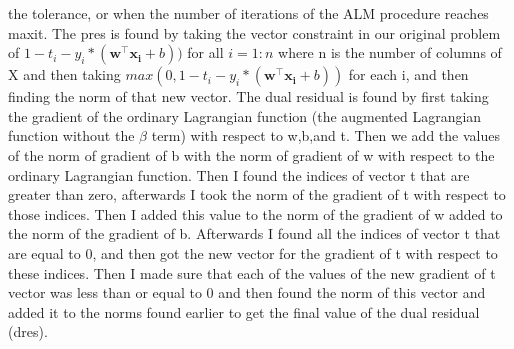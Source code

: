 \documentclass[11pt]{article}
\begin{document}
the 
tolerance, or when the number of iterations of the ALM procedure reaches maxit. The pres is found by 
taking 
the vector constraint in our original problem of $1-t_{i}-y_{i}*\left(\mathbf{w}^\intercal 
\mathbf{x_{i}}
+b 
\right))$ for all $i= 1:n$ where n is the number of columns of X and then taking $max(0,1-t_{i}-y_{i}*
\left(\mathbf{w}^\intercal \mathbf{x_{i}}+b \right))$ for each i, and then finding the norm of that new 
vector. The dual residual is 
found by first taking the gradient of the ordinary Lagrangian function (the augmented Lagrangian 
function 
without the 	$\beta$ term) with respect to w,b,and t. Then we add the values of the norm of gradient of b 
with the norm of gradient of w with respect to the ordinary Lagrangian function. Then I found the 
indices 
of vector t that are greater than zero, afterwards I took the norm of the gradient of t with respect to 
those indices. Then I added this value to the norm of the gradient of w added to the norm of the 
gradient 
of b. Afterwards I found all the indices of vector t that are equal to 0, and then got the new vector 
for 
the gradient of t with respect to these indices. Then I made sure that each of the values of the new 
gradient of t vector was less than or equal to 0 and then found the norm of this vector and added it to 
the 
norms found earlier to get the final value of the dual residual (dres). 
\end{document}
